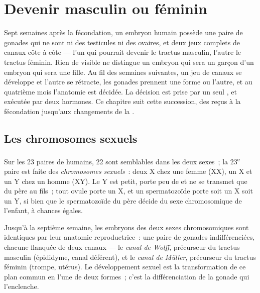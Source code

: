 \chapter{Devenir masculin ou féminin}\label{ch:g11:becoming-male-female}

Sept semaines après la fécondation, un embryon humain possède une paire
de gonades qui ne sont ni des testicules ni des ovaires, et deux jeux
complets de canaux côte à côte --- l'un qui pourrait devenir le
tractus masculin, l'autre le tractus féminin. Rien de visible ne
distingue un embryon qui sera un garçon d'un embryon qui sera une
fille. Au fil des semaines suivantes, un jeu de canaux se développe et
l'autre se rétracte, les gonades prennent une forme ou l'autre, et au
quatrième mois l'anatomie est décidée. La décision est prise par un
seul , et exécutée par deux hormones. Ce chapitre suit cette
succession, des  reçus à la fécondation jusqu'aux
changements de la .

\section{Les chromosomes sexuels}

\begin{definition}\label{def:g11:becoming-male-female:chromosomes}
Sur les 23 paires de  humains, 22 sont semblables dans les
deux sexes~; la 23\textsuperscript{e} paire est faite des
\emph{chromosomes sexuels}~: deux
 X chez une femme (XX), un X et un Y chez un homme (XY). Le
Y est petit, porte peu de  et ne se transmet que du père au fils~;
tout ovule porte un X, et un spermatozoïde porte soit un X soit un Y,
si bien que le spermatozoïde du père décide du sexe chromosomique de
l'enfant, à chances égales.
\end{definition}

\begin{proposition}\label{prop:g11:becoming-male-female:undifferentiated}
Jusqu'à la septième semaine, les embryons des deux sexes chromosomiques
sont identiques par leur anatomie reproductrice~: une paire de gonades
indifférenciées, chacune flanquée de deux canaux --- le \emph{canal de
Wolff}, précurseur du tractus masculin (épididyme, canal déférent), et
le \emph{canal de Müller}, précurseur du tractus féminin (trompe,
utérus). Le développement sexuel est la transformation de ce plan
commun en l'une de deux formes~; c'est la différenciation de la gonade
qui l'enclenche.
\end{proposition}
\admitted

